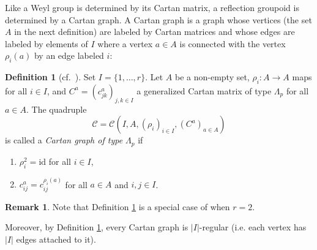 \documentclass[11pt,a4paper]{amsart}
\theoremstyle{definition}
\newtheorem{Definition}[Lemma]{Definition}
\newtheorem{Remark}[Lemma]{Remark}
\numberwithin{equation}{section}
\newcommand{\id }{\mathrm{id}}
\newcommand{\rfl }{\rho }
\newcommand{\Cm }{C}
\newcommand{\Cc }{\mathcal{C}}
\newcommand{\cm }{c}
\newcommand{\Ri}{D_p}
\begin{document}
Like a Weyl group is determined by its Cartan matrix, a reflection groupoid is determined by a Cartan graph. A Cartan graph is a graph whose vertices (the set $A$ in the next definition) are labeled by Cartan matrices and whose edges are labeled by elements of $I$ where
a vertex $a\in A$ is connected with the vertex $\rho_i(a)$ by an edge labeled $i$:

\begin{Definition}[cf.\ {\cite[Def.\ 2.1]{p-CH09a}}]\label{def:cartangraph}
Set $I=\{1,\ldots,r\}$.
Let $A$ be a non-empty set, $\rfl _i : A \to A$ maps for all $i\in I$,
and $\Cm ^a=(\cm ^a_{jk})_{j,k \in I}$ a generalized Cartan matrix of type $\Lambda_p$
for all $a\in A$. The quadruple
\[ \Cc = \Cc (I,A,(\rfl _i)_{i \in I}, (\Cm ^a)_{a \in A})\]
is called a \emph{Cartan graph of type $\Lambda_p$} if
\begin{enumerate}
\item[(C1)] $\rfl _i^2 = \id$ for all $i \in I$,
\item[(C2)] $\cm ^a_{ij} = \cm ^{\rfl _i(a)}_{ij}$ for all $a\in A$ and $i,j\in I$.
\end{enumerate}
\end{Definition}

\begin{Remark}
Note that Definition \ref{def:cartangraph} is a special case of \cite[Definition 2.1]{p-CH11} when $r=2$.

Moreover, by Definition 
\ref{def:cartangraph},
every Cartan graph is
$|I|$-regular (i.e. each vertex has 
$|I|$ edges attached to it). 
\end{Remark}
\end{document}

